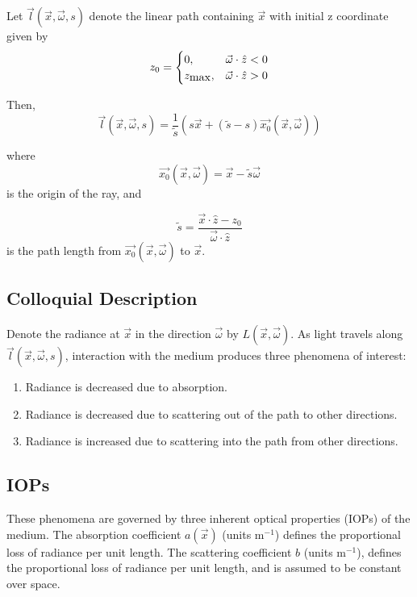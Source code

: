 
Let $\vec{l}(\vec{x}, \vec{\omega}, s)$ denote the linear path containing $\vec{x}$
with initial z coordinate given by
\begin{equation}
  z_0 =
   \begin{cases}
    0, & \vec{\omega} \cdot \hat{z} < 0 \\
    z_{\mbox{max}}, & \vec{\omega} \cdot \hat{z} > 0
  \end{cases}
\end{equation}

Then,
\begin{equation}
  \vec{l}(\vec{x}, \vec{\omega}, s) = \frac{1}{\tilde{s}} (s\vec{x} + (\tilde{s} - s)\vec{x_0}(\vec{x}, \vec{\omega}))
\end{equation}

where
\begin{equation}
  \vec{x_0}(\vec{x}, \vec{\omega}) = \vec{x} - \tilde{s} \vec{\omega}
\end{equation}
is the origin of the ray, and 

\begin{equation}
  \tilde{s} = \frac{\vec{x} \cdot \hat{z} - z_0}{\vec{\omega} \cdot \hat{z}}
\end{equation}
is the path length from $\vec{x_0}(\vec{x}, \vec{\omega})$ to $\vec{x}$.

\subsection{Colloquial Description}
Denote the radiance at $\vec{x}$ in the direction $\vec{\omega}$ by $L(\vec{x}, \vec{\omega})$.
As light travels along $\vec{l}(\vec{x}, \vec{\omega}, s)$, interaction with the
medium produces three phenomena of interest:
\begin{enumerate}
  \item Radiance is decreased due to absorption.
  \item Radiance is decreased due to scattering out of the path to other
    directions.
  \item Radiance is increased due to scattering into the path from other
      directions.
\end{enumerate}

\subsection{IOPs}
These phenomena are governed by three inherent optical properties (IOPs) of the
medium.
The absorption coefficient $a(\vec{x})$ (units m$^{-1}$) defines the
proportional loss of radiance per unit length.
The scattering coefficient $b$ (units m$^{-1}$), defines the proportional loss
of radiance per unit length, and is assumed to be constant over space.

